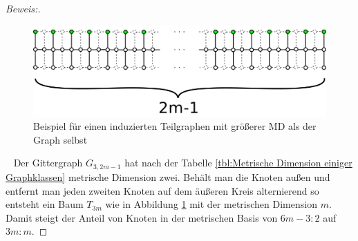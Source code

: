 \begin{proof}[Beweis:]$\;$
\begin{figure}[h!]
		\centering 		 
\includegraphics[width=420pt]{bilder/gitterzubaumlsch.pdf}
   \caption{Beispiel für einen induzierten Teilgraphen mit größerer MD als der Graph selbst}
   \label{bild:Gitterbaum2}
  	 \end{figure}
~ \linebreak
Der Gittergraph $G_{3,2m-1}$ hat nach der Tabelle \ref{tbl:Metrische Dimension einiger Graphklassen} metrische Dimension zwei. Behält man die Knoten außen und entfernt man jeden zweiten Knoten auf dem äußeren Kreis alternierend so entsteht ein Baum $T_{3m}$ wie in Abbildung \ref{bild:Gitterbaum2} mit der metrischen Dimension $m$. Damit steigt der Anteil von Knoten in der metrischen Basis von $6m-3:2$ auf $3m:m$.
\end{proof}


